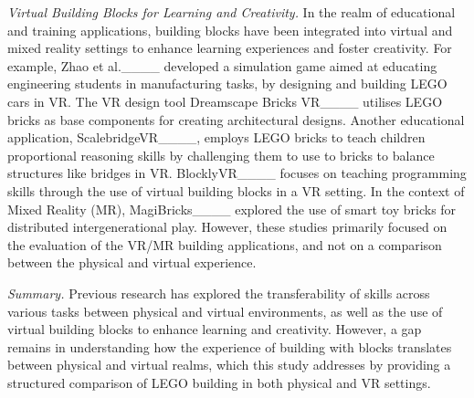 \textit{Virtual Building Blocks for Learning and Creativity.}
In the realm of educational and training applications, building blocks have been integrated into virtual and mixed reality settings to enhance learning experiences and foster creativity.
For example, Zhao et al.____ developed a simulation game aimed at educating engineering students in manufacturing tasks, by designing and building LEGO cars in VR. 
The VR design tool Dreamscape Bricks VR____ utilises LEGO bricks as base components for creating architectural designs.
Another educational application, ScalebridgeVR____, employs LEGO bricks to teach children proportional reasoning skills by challenging them to use to bricks to balance structures like bridges in VR.
BlocklyVR____ focuses on teaching programming skills through the use of virtual building blocks in a VR setting.
In the context of Mixed Reality (MR), MagiBricks____ explored the use of smart toy bricks for distributed intergenerational play.
However, these studies primarily focused on the evaluation of the VR/MR building applications, and not on a comparison between the physical and virtual experience.

\textit{Summary.} Previous research has explored the transferability of skills across various tasks between physical and virtual environments, as well as the use of virtual building blocks to enhance learning and creativity. 
However, a gap remains in understanding how the experience of building with blocks translates between physical and virtual realms, which this study addresses by providing a structured comparison of LEGO building in both physical and VR settings.